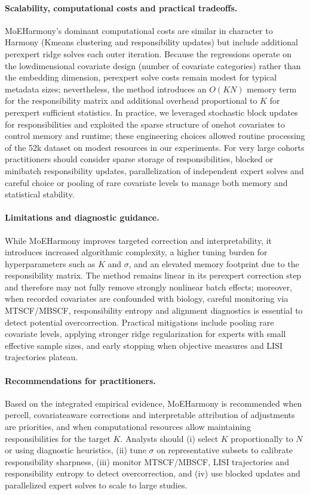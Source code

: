 \documentclass{article}
\begin{document}
\paragraph{Scalability, computational costs and practical trade\-offs.} MoE\-Harmony’s dominant computational costs are similar in character to Harmony (K\-means clustering and responsibility updates) but include additional per\-expert ridge solves each outer iteration. Because the regressions operate on the low\-dimensional covariate design (number of covariate categories) rather than the embedding dimension, per\-expert solve costs remain modest for typical metadata sizes; nevertheless, the method introduces an $O(KN)$ memory term for the responsibility matrix and additional overhead proportional to $K$ for per\-expert sufficient statistics. In practice, we leveraged stochastic block updates for responsibilities and exploited the sparse structure of one\-hot covariates to control memory and runtime; these engineering choices allowed routine processing of the 52k dataset on modest resources in our experiments. For very large cohorts practitioners should consider sparse storage of responsibilities, blocked or mini\-batch responsibility updates, parallelization of independent expert solves and careful choice or pooling of rare covariate levels to manage both memory and statistical stability.

\paragraph{Limitations and diagnostic guidance.} While MoE\-Harmony improves targeted correction and interpretability, it introduces increased algorithmic complexity, a higher tuning burden for hyperparameters such as $K$ and $\sigma$, and an elevated memory footprint due to the responsibility matrix. The method remains linear in its per\-expert correction step and therefore may not fully remove strongly nonlinear batch effects; moreover, when recorded covariates are confounded with biology, careful monitoring via MTSCF/MBSCF, responsibility entropy and alignment diagnostics is essential to detect potential overcorrection. Practical mitigations include pooling rare covariate levels, applying stronger ridge regularization for experts with small effective sample sizes, and early stopping when objective measures and LISI trajectories plateau.

\paragraph{Recommendations for practitioners.} Based on the integrated empirical evidence, MoE\-Harmony is recommended when per\-cell, covariate\-aware corrections and interpretable attribution of adjustments are priorities, and when computational resources allow maintaining responsibilities for the target $K$. Analysts should (i) select $K$ proportionally to $N$ or using diagnostic heuristics, (ii) tune $\sigma$ on representative subsets to calibrate responsibility sharpness, (iii) monitor MTSCF/MBSCF, LISI trajectories and responsibility entropy to detect overcorrection, and (iv) use blocked updates and parallelized expert solves to scale to large studies.
\end{document}
